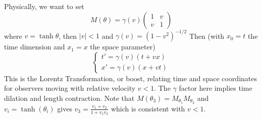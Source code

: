 Physically, we want to set
$$M(\theta)=\gamma(v)\begin{pmatrix}
    1&v\\
    v&1
\end{pmatrix}$$
where $v=\tanh\theta$, then $|v|<1$ and $\gamma(v)=(1-v^2)^{-1/2}$
Then (with $x_0=t$ the time dimension and $x_1=x$ the space parameter)
$$\begin{cases}
    t'=\gamma(v)(t+vx)\\
    x'=\gamma(v)(x+vt)
\end{cases}$$
This is the Lorentz Transformation, or boost, relating time and space coordinates for observers moving with relative velocity $v<1$.
The $\gamma$ factor here implies time dilation and length contraction.
Note that $M(\theta_3)=M_{\theta_1}M_{\theta_2}$ and $v_i=\tanh(\theta_i)$ gives $v_3=\frac{v_1+v_2}{1+v_1v_2}$ which is consistent with $v<1$.